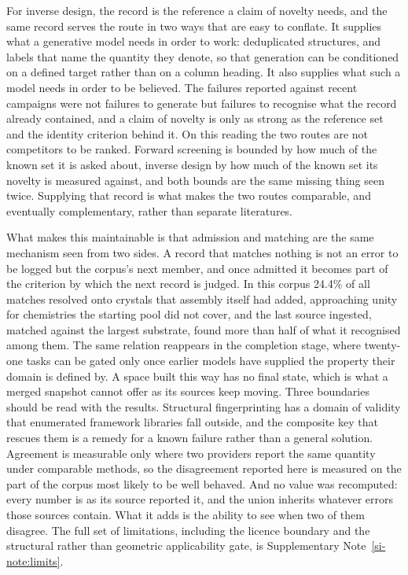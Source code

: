 For inverse design, the record is the reference a claim of novelty needs, and
the same record serves the route in two ways that are easy to conflate. It
supplies what a generative model needs in order to work: deduplicated structures,
and labels that name the quantity they denote, so that generation can be
conditioned on a defined target rather than on a column heading. It also supplies
what such a model needs in order to be believed. The failures reported against
recent campaigns
\cite{cheetham2024artificial,juelsholt2026continued,szymanski2025baselines} were
not failures to generate but failures to recognise what the record already
contained, and a claim of novelty is only as strong as the reference set and the
identity criterion behind it. On this reading the two routes are not competitors
to be ranked. Forward screening is bounded by how much of the known set it is
asked about, inverse design by how much of the known set its novelty is measured
against, and both bounds are the same missing thing seen twice. Supplying that
record is what makes the two routes comparable, and eventually complementary,
rather than separate literatures.

What makes this maintainable is that admission and matching are the same
mechanism seen from two sides. A record that matches nothing is not an error to
be logged but the corpus's next member, and once admitted it becomes part of the
criterion by which the next record is judged. In this corpus 24.4\% of all matches
resolved onto crystals that assembly itself had added, approaching unity for
chemistries the starting pool did not cover, and the last source ingested, matched
against the largest substrate, found more than half of what it recognised among
them. The same relation reappears in the completion stage,
where twenty-one tasks can be gated only once earlier models have supplied the
property their domain is defined by. A space built this way has no final state,
which is what a merged snapshot cannot offer as its sources keep moving. Three
boundaries should be read with the results. Structural fingerprinting has a
domain of validity that enumerated framework libraries fall outside, and the
composite key that rescues them is a remedy for a known failure rather than a
general solution. Agreement is measurable only where two providers report the
same quantity under comparable methods, so the disagreement reported here is
measured on the part of the corpus most likely to be well behaved. And no value
was recomputed: every number is as its source reported it, and the union inherits
whatever errors those sources contain. What it adds is the ability to see when
two of them disagree. The full set of limitations, including the licence boundary
and the structural rather than geometric applicability gate, is
Supplementary Note~\ref{si-note:limits}.

